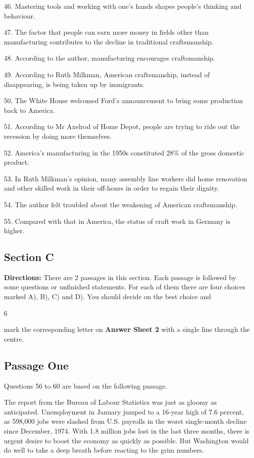 \documentclass[UTF8,11pt]{ctexart}
\begin{document}
46. Mastering tools and working with one’s hands shapes people’s thinking and behaviour.


47. The factor that people can earn more money in fields other than manufacturing contributes to the decline in traditional craftsmanship.


48. According to the author, manufacturing encourages craftsmanship.


49. According to Ruth Milkman, American craftsmanship, instead of disappearing, is being taken up by immigrants.


50. The White House welcomed Ford’s announcement to bring some production back to America.


51. According to Mr Axelrod of Home Depot, people are trying to ride out the recession by doing more themselves.


52. America’s manufacturing in the 1950s constituted 28\% of the gross domestic product.


53. In Ruth Milkman’s opinion, many assembly line workers did home renovation and other skilled work in their off-hours in order to regain their dignity.


54. The author felt troubled about the weakening of American craftsmanship.


55. Compared with that in America, the status of craft work in Germany is higher.


\subsection*{\textbf{Section C}}


\textbf{Directions:} There are 2 passages in this section. Each passage is followed by some questions or unfinished statements. For each of them there are four choices marked A), B), C) and D). You should decide on the best choice and


6


mark the corresponding letter on\textbf{ Answer Sheet 2} with a single line through the centre.


\subsection*{Passage One}


Questions 56 to 60 are based on the following passage.


The report from the Bureau of Labour Statistics was just as gloomy as anticipated. Unemployment in January jumped to a 16-year high of 7.6 percent, as 598,000 jobs were slashed from U.S. payrolls in the worst single-month decline since December, 1974. With 1.8 million jobs lost in the last three months, there is urgent desire to boost the economy as quickly as possible. But Washington would do well to take a deep breath before reacting to the grim numbers.
\end{document}
